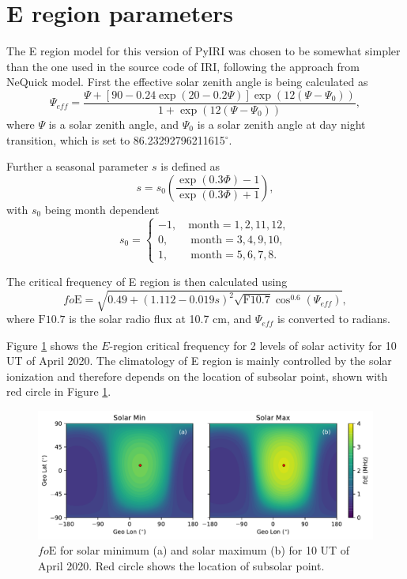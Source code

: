 \documentclass[draft]{agujournal2019}
\begin{document}
\section{E region parameters}\label{sec:NmE}
The E region model for this version of PyIRI was chosen to be somewhat simpler than the one used in the source code of IRI, following the approach from NeQuick model. First the effective solar zenith angle is being calculated as
\begin{equation}\label{eqn:effective_sz}
\Psi_{eff}=\frac{\Psi+ \left[ 90-0.24\exp(20-0.2\Psi) \right]\exp(12(\Psi-\Psi_0))}{1+\exp(12(\Psi-\Psi_0))},
\end{equation}
where $\Psi$ is a solar zenith angle, and $\Psi_0$ is a solar zenith angle at day night transition, which is set to 86.23292796211615$^{\circ}$. 

Further a seasonal parameter $s$ is defined as 
\begin{equation}\label{eqn:s}
s=s_0 \left(\frac{\exp(0.3\Phi)-1}{\exp(0.3\Phi)+1}\right),
\end{equation}
with $s_0$ being month dependent
\begin{equation}\label{eqn:s}
s_0 =
\left\{ 
\begin{array}{l}-1, \quad \mathrm{month} = 1,2,11,12, \\ 
0, \quad \quad \mathrm{month} = 3,4,9,10, \\ 
1, \quad \quad \mathrm{month} = 5,6,7,8. 
\end{array} 
\right.
\end{equation}

The critical frequency of E region is then calculated using 
\begin{equation}\label{eqn:foE}
fo\mathrm{E}=\sqrt{0.49+(1.112-0.019s)^2\sqrt{\mathrm{F10.7}} \cos^{0.6}(\Psi_{eff})},
\end{equation}
where $\mathrm{F10.7}$ is the solar radio flux at 10.7 cm, and $\Psi_{eff}$ is converted to radians. 

Figure \ref{fig:foE_min_max} shows the $E$-region critical frequency for 2 levels of solar activity for 10 UT of April 2020. The climatology of E region is mainly controlled by the solar ionization and therefore depends on the location of subsolar point, shown with red circle in Figure \ref{fig:foE_min_max}.  

\begin{figure}[H]
  \includegraphics[scale=0.7]{PyIRI_foE_min_max.pdf}
  \caption{$fo\mathrm{E}$ for solar minimum (a) and solar maximum (b) for 10 UT of April 2020. Red circle shows the location of subsolar point.}
  \label{fig:foE_min_max}
\end{figure}
\end{document}
